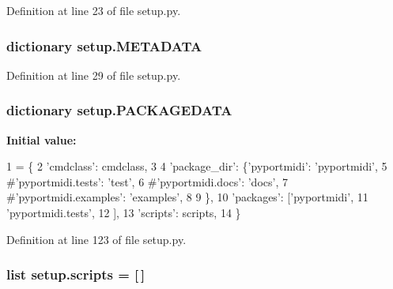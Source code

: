 Definition at line 23 of file setup.\+py.

\subsubsection[{\texorpdfstring{M\+E\+T\+A\+D\+A\+TA}{METADATA}}]{\setlength{\rightskip}{0pt plus 5cm}dictionary setup.\+M\+E\+T\+A\+D\+A\+TA}\hypertarget{namespacesetup_ae910ca5aee952094e9be80bfbe5b8d63}{}\label{namespacesetup_ae910ca5aee952094e9be80bfbe5b8d63}


Definition at line 29 of file setup.\+py.

\subsubsection[{\texorpdfstring{P\+A\+C\+K\+A\+G\+E\+D\+A\+TA}{PACKAGEDATA}}]{\setlength{\rightskip}{0pt plus 5cm}dictionary setup.\+P\+A\+C\+K\+A\+G\+E\+D\+A\+TA}\hypertarget{namespacesetup_a2ffaed6c0e5f1ac12a3dcac3a3264576}{}\label{namespacesetup_a2ffaed6c0e5f1ac12a3dcac3a3264576}
{\bfseries Initial value\+:}
\begin{DoxyCode}
1 = \{
2     \textcolor{stringliteral}{'cmdclass'}:    cmdclass,
3 
4     \textcolor{stringliteral}{'package\_dir'}: \{\textcolor{stringliteral}{'pyportmidi'}: \textcolor{stringliteral}{'pyportmidi'},
5                     \textcolor{comment}{#'pyportmidi.tests': 'test',}
6                     \textcolor{comment}{#'pyportmidi.docs': 'docs',}
7                     \textcolor{comment}{#'pyportmidi.examples': 'examples',}
8 
9                    \},
10     \textcolor{stringliteral}{'packages'}: [\textcolor{stringliteral}{'pyportmidi'},
11                  \textcolor{stringliteral}{'pyportmidi.tests'}, 
12                 ],
13     \textcolor{stringliteral}{'scripts'}: scripts,
14 \}
\end{DoxyCode}


Definition at line 123 of file setup.\+py.

\subsubsection[{\texorpdfstring{scripts}{scripts}}]{\setlength{\rightskip}{0pt plus 5cm}list setup.\+scripts = \mbox{[}$\,$\mbox{]}}\hypertarget{namespacesetup_ac1f45f8d37050b278bf63c812b1130dd}{}\label{namespacesetup_ac1f45f8d37050b278bf63c812b1130dd}


